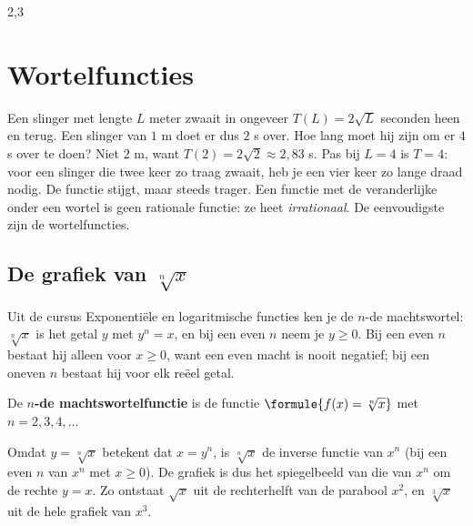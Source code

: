 \begin{alleenvoor}{2,3}
\section{Wortelfuncties}\label{sec:h2-wortel}

Een slinger met lengte $L$ meter zwaait in ongeveer $T(L) = 2\sqrt{L}$ seconden heen en terug. Een slinger van $1$ m doet er dus $2$ s over. Hoe lang moet hij zijn om er $4$ s over te doen? Niet $2$ m, want $T(2) = 2\sqrt2 \approx 2{,}83$ s. Pas bij $L = 4$ is $T = 4$: voor een slinger die twee keer zo traag zwaait, heb je een vier keer zo lange draad nodig. De functie stijgt, maar steeds trager. Een functie met de veranderlijke onder een wortel is geen rationale functie: ze heet \textit{irrationaal}. De eenvoudigste zijn de wortelfuncties.

\subsection{De grafiek van $\sqrt[n]{x}$}

Uit de cursus Exponentiële en logaritmische functies ken je de $n$-de machtswortel: $\sqrt[n]{x}$ is het getal $y$ met $y^n = x$, en bij een even $n$ neem je $y \geqslant 0$. Bij een even $n$ bestaat hij alleen voor $x \geqslant 0$, want een even macht is nooit negatief; bij een oneven $n$ bestaat hij voor elk reëel getal.

\begin{theorie}
De \textbf{\textcolor{accent}{$n$-de machtswortelfunctie}} is de functie \quad $\formule{f(x) = \sqrt[n]{x}}$ \quad met $n = 2, 3, 4, \ldots$
\end{theorie}

Omdat $y = \sqrt[n]{x}$ betekent dat $x = y^n$, is $\sqrt[n]{x}$ de inverse functie van $x^n$ (bij een even $n$ van $x^n$ met $x \geqslant 0$). De grafiek is dus het spiegelbeeld van die van $x^n$ om de rechte $y = x$. Zo ontstaat $\sqrt{x}$ uit de rechterhelft van de parabool $x^2$, en $\sqrt[3]{x}$ uit de hele grafiek van $x^3$.


\end{alleenvoor}
